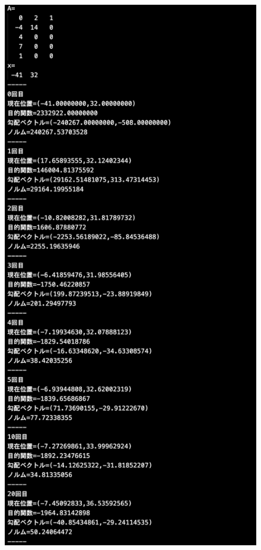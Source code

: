 \documentclass[12pt]{jarticle}
\begin{document}
\clearpage
\begin{figure}[h]
    \begin{center}
        \includegraphics[scale=0.2]{kadai1_2s_out3_1_1.png}
    \end{center}

\end{figure}
\end{document}

